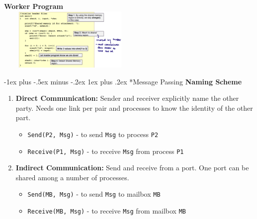 \documentclass[10pt,landscape]{article}
\makeatletter
\renewcommand{\subsubsection}{\@startsection{subsubsection}{3}{0mm}%
                                {-1ex plus -.5ex minus -.2ex}%
                                {1ex plus .2ex}%
                                {\normalfont\small\bfseries}}
\makeatother
\begin{document}
\begin{multicols*}{3}
\textbf{Worker Program} \\ 
\includegraphics*[width=7cm, height=3cm]{images/workerprogram.png}

\subsubsection*{Message Passing}
\textbf{Naming Scheme}
\begin{enumerate}[topsep=0pt,noitemsep,wide=0pt, leftmargin=\dimexpr\labelwidth + 2\labelsep\relax]
    \item \textbf{Direct Communication:} Sender and receiver explicitly name the other party. Needs one link per pair and processes to know the identity of the other part.
        \begin{itemize}[topsep=0pt,noitemsep,wide=0pt, leftmargin=\dimexpr{} + 2\relax]
            \item \verb|Send(P2, Msg)| - to send \verb|Msg| to process \verb|P2|
            \item \verb|Receive(P1, Msg)| - to receive \verb|Msg| from process \verb|P1|
        \end{itemize}
    \item \textbf{Indirect Communication:} Send and receive from a port. One port can be shared among a number of processes.
        \begin{itemize}[topsep=0pt,noitemsep,wide=0pt, leftmargin=\dimexpr{} + 2\relax]
            \item \verb|Send(MB, Msg)| - to send \verb|Msg| to mailbox \verb|MB|
            \item \verb|Receive(MB, Msg)| - to receive \verb|Msg| from mailbox \verb|MB|
        \end{itemize}
\end{enumerate}


\end{multicols*}
\end{document}
